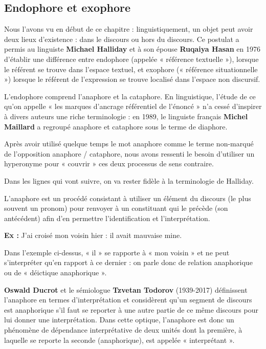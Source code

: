 \subsection{Endophore et exophore}
Nous l’avons vu en début de ce chapitre : linguistiquement, un objet peut avoir deux lieux d’existence : dans le discours ou hors du discours. Ce postulat a permis au linguiste \textbf{Michael Halliday} et à son épouse \textbf{Ruqaiya Hasan} en 1976 d’établir une différence entre endophore (appelée « référence textuelle »), lorsque le référent se trouve dans l’espace textuel, et exophore (« référence situationnelle ») lorsque le référent de l’expression se trouve localisé dans l’espace non discursif.

L’endophore comprend l’anaphore et la cataphore. En linguistique, l’étude de ce qu’on appelle « les marques d’ancrage référentiel de l’énoncé » n’a cessé d’inspirer à divers auteurs une riche terminologie : en 1989, le linguiste français \textbf{Michel Maillard} a regroupé anaphore et cataphore sous le terme de diaphore.

\begin{lecture}{}
Après avoir utilisé quelque temps le mot anaphore comme le terme non-marqué de l’opposition anaphore / cataphore, nous avons ressenti le besoin d’utiliser un hyperonyme pour « couvrir » ces deux processus de sens contraire.
\end{lecture}

Dans les lignes qui vont suivre, on va rester fidèle à la terminologie de Halliday.

L’anaphore est un procédé consistant à utiliser un élément du discours (le plus souvent un pronom) pour renvoyer à un constituant qui le précède (son antécédent) afin d’en permettre l’identification et l’interprétation.

\textbf{Ex :} J’ai croisé mon voisin hier : il avait mauvaise mine.

Dans l’exemple ci-dessus, « il » se rapporte à « mon voisin » et ne peut s’interpréter qu’en rapport à ce dernier : on parle donc de relation anaphorique ou de « déictique anaphorique ».

\textbf{Oswald Ducrot} et le sémiologue \textbf{Tzvetan Todorov} (1939-2017) définissent l’anaphore en termes d’interprétation et considèrent qu’un segment de discours est anaphorique s’il faut se reporter à une autre partie de ce même discours pour lui donner une interprétation. Dans cette optique, l’anaphore est donc un phénomène de dépendance interprétative de deux unités dont la première, à laquelle se reporte la seconde (anaphorique), est appelée « interprétant ».

